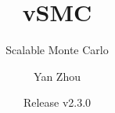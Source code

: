 \title{vSMC}
\subtitle{Scalable Monte Carlo}
\author{Yan Zhou}
\date{Release v2.3.0}
\maketitle
\tableofcontents
\listoftables

